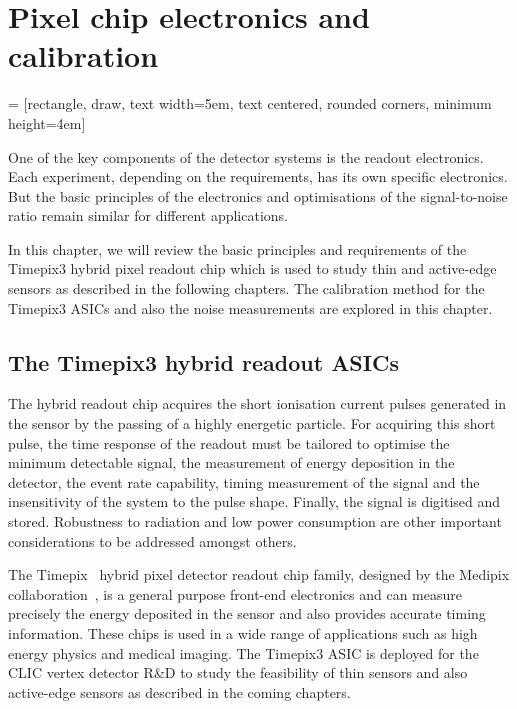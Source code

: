 \chapter{Pixel chip electronics and calibration}
\label{ch:FE_electronics}

 = [rectangle, draw, text width=5em, text centered, rounded corners, minimum
height=4em]
\usetikzlibrary{backgrounds,fit,decorations.pathreplacing} 

One of the key components of the detector systems is the readout
electronics. Each experiment, depending on the requirements, has its
own specific electronics. But the basic principles of the electronics
and optimisations of the signal-to-noise ratio remain similar for
different applications.

In this chapter, we will review the basic principles and requirements
of the Timepix3 hybrid pixel readout chip which is used to study thin
and active-edge sensors as described in the following chapters. The
calibration method for the Timepix3 ASICs and also the noise
measurements are explored in this chapter.

\section{The Timepix3 hybrid readout ASICs}
\label{sec:TimepixChip}

The hybrid readout chip acquires the short ionisation current pulses
generated in the sensor by the passing of a highly energetic
particle. For acquiring this short pulse, the time response of the
readout must be tailored to optimise the minimum detectable signal,
the measurement of energy deposition in the detector, the event rate
capability, timing measurement of the signal and the insensitivity of
the system to the pulse shape. Finally, the signal is digitised and
stored. Robustness to radiation and low power consumption are other
important considerations to be addressed amongst others.


The Timepix~\cite{art:tmpx,Timepix3Poikela} hybrid pixel detector
readout chip family, designed by the Medipix
collaboration~\cite{medipixCollaboration}, is a general purpose
front-end electronics and can measure precisely the energy deposited
in the sensor and also provides accurate timing information. These
chips is used in a wide range of applications such as high energy
physics and medical imaging. The Timepix3 ASIC is deployed for the
CLIC vertex detector R\&D to study the feasibility of thin sensors and
also active-edge sensors as described in the coming chapters.

